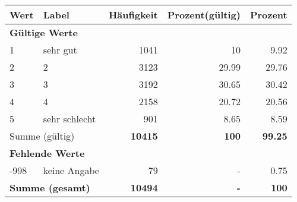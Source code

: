      \begin{longtable}{lXrrr}
     \toprule
     \textbf{Wert} & \textbf{Label} & \textbf{Häufigkeit} & \textbf{Prozent(gültig)} & \textbf{Prozent} \\
     \endhead
     \midrule
     \multicolumn{5}{l}{\textbf{Gültige Werte}}\\

     1 &
     \multicolumn{1}{X}{ sehr gut   } &


       \num{1041} &
       \num[round-mode=places,round-precision=2]{10} &
         \num[round-mode=places,round-precision=2]{9.92} \\

     2 &
     \multicolumn{1}{X}{ 2   } &


       \num{3123} &
       \num[round-mode=places,round-precision=2]{29.99} &
         \num[round-mode=places,round-precision=2]{29.76} \\

     3 &
     \multicolumn{1}{X}{ 3   } &


       \num{3192} &
       \num[round-mode=places,round-precision=2]{30.65} &
         \num[round-mode=places,round-precision=2]{30.42} \\

     4 &
     \multicolumn{1}{X}{ 4   } &


       \num{2158} &
       \num[round-mode=places,round-precision=2]{20.72} &
         \num[round-mode=places,round-precision=2]{20.56} \\

     5 &
     \multicolumn{1}{X}{ sehr schlecht   } &


       \num{901} &
       \num[round-mode=places,round-precision=2]{8.65} &
         \num[round-mode=places,round-precision=2]{8.59} \\
     \midrule
     \multicolumn{2}{l}{Summe (gültig)} &
       \textbf{\num{10415}} &
     \textbf{\num{100}} &
       \textbf{\num[round-mode=places,round-precision=2]{99.25}} \\
     \multicolumn{5}{l}{\textbf{Fehlende Werte}}\\
       -998 &
       keine Angabe &
         \num{79} &
        - &
         \num[round-mode=places,round-precision=2]{0.75} \\
     \midrule
     \multicolumn{2}{l}{\textbf{Summe (gesamt)}} &
          \textbf{\num{10494}} &
        \textbf{-} &
        \textbf{\num{100}} \\
     \bottomrule
     \end{longtable}
     
